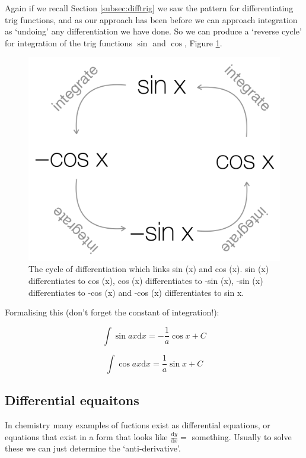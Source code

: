 \documentclass[
]{book}
\begin{document}
Again if we recall Section \ref{subsec:difftrig} we saw the pattern for differentiating trig functions, and as our approach has been before we can approach integration as `undoing' any differentiation we have done. So we can produce a `reverse cycle' for integration of the trig functions \(\sin\) and \(\cos\), Figure \ref{fig:trigint}.

\begin{figure}

{\centering \includegraphics[width=0.6\linewidth]{images/trigint} 

}

\caption{The cycle of differentiation which links sin (x) and cos (x). sin (x) differentiates to cos (x), cos (x) differentiates to -sin (x), -sin (x) differentiates to -cos (x) and -cos (x) differentiates to sin x.}\label{fig:trigint}
\end{figure}

Formalising this (don't forget the constant of integration!):

\begin{equation}
\int \sin ax \textrm{d}x = -\frac{1}{a} \cos x + C
\label{eq:intsin}
\end{equation}

\begin{equation}
\int \cos ax \textrm{d}x = \frac{1}{a} \sin x + C
\label{eq:intsin}
\end{equation}

\hypertarget{subsec:diffequations}{%
\subsection{Differential equaitons}\label{subsec:diffequations}}

In chemistry many examples of fuctions exist as differential equations, or equations that exist in a form that looks like \(\tfrac{\textrm{d}y}{\textrm{d}x}=\) something. Usually to solve these we can just determine the `anti-derivative'.
\end{document}
